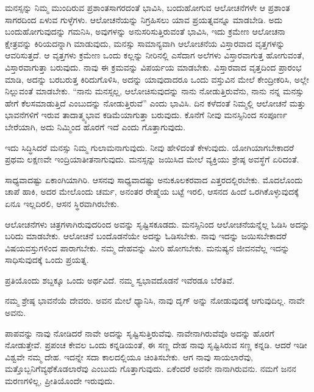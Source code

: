 \vskip 3pt

ಮನಸ್ಸನ್ನು ನಿಮ್ಮ ಮುಂದಿರುವ ಪ್ರಶಾಂತಸಾಗರದಂತೆ ಭಾವಿಸಿ, ಬಂದುಹೋಗುವ ಆಲೋಚನೆಗಳೇ ಆ ಪ್ರಶಾಂತ ಸಾಗರದಿಂದ ಏಳುವ ಗುಳ್ಳೆಗಳು. ಆಲೋಚನೆಯನ್ನು ನಿಗ್ರಹಿಸಲು ಯಾವ ಪ್ರಯತ್ನವನ್ನೂ ಮಾಡಬೇಡಿ. ಅದು ಬಂದುಹೋಗುವುದನ್ನು ಗಮನಿಸಿ, ಅವುಗಳನ್ನು ಅನುಸರಿಸುತ್ತಿರುವಂತೆ ಭಾವಿಸಿ, ಇದು ಕ್ರಮೇಣ ಆಲೋಚನಾ ಕ್ಷೇತ್ರವನ್ನು ಕಿರಿಯದನ್ನಾಗಿ ಮಾಡುವುದು, ಮನಸ್ಸು ಸಾಮಾನ್ಯವಾಗಿ ಆಲೋಚನೆಯ ವಿಸ್ತಾರವಾದ ವೃತ್ತಗಳನ್ನು ಆವರಿಸುತ್ತದೆ. ಆ ವೃತ್ತಗಳು ಕ್ರಮೇಣ ಒಂದು ಕಲ್ಲನ್ನು ನೀರಿನಲ್ಲಿ ಎಸೆದಾಗ ಅಲೆಗಳು ವಿಸ್ತಾರವಾಗುತ್ತ ಹೋಗುವಂತೆ, ವಿಸ್ತಾರವಾಗುತ್ತಾ ಬರುವುದು. ನಾವು ಈ ಕ್ರಮವನ್ನು ವಿಪರ್ಯಯ ಮಾಡಬೇಕು. ವಿಸ್ತಾರವಾದ ವೃತ್ತದಿಂದ ಪ್ರಾರಂಭ ಮಾಡಿ, ಅದನ್ನು ಬರಬರುತ್ತ ಕಿರಿದುಗೊಳಿಸಿ, ಅದನ್ನು ಯಾವುದಾದರೂ ಒಂದು ವಸ್ತುವಿನ ಮೇಲೆ ಕೇಂದ್ರೀಕರಿಸಿ, ಅಲ್ಲೇ ನಿಲ್ಲುವಂತೆ ಮಾಡಬೇಕು. “ನಾನು ಮನಸ್ಸಲ್ಲ, ಆಲೋಚಿಸುವುದನ್ನು ನಾನು ನೋಡುತ್ತಿರುವೆನು, ನಾನು ನನ್ನ ಮನಸ್ಸು ಹೇಗೆ ಕೆಲಸಮಾಡುತ್ತಿದೆ ಎಂಬುದನ್ನು ನೋಡುತ್ತಿರುವೆ'' ಎಂದು ಭಾವಿಸಿ. ದಿನ ಕಳೆದಂತೆ ನಿಮ್ಮಲ್ಲಿ ಆಲೋಚನೆ ಮತ್ತು ಭಾವನೆಗಳಿಗೆ ಇರುವ ತಾದಾತ್ಮ್ಯಭಾವ ಕಡಿಮೆಯಾಗುತ್ತಾ ಬರುವುದು. ಕೊನೆಗೆ ನೀವು ಮನಸ್ಸಿನಿಂದ ಸಂಪೂರ್ಣ ಬೇರೆಯಾಗಿ, ಅದು ನಿಮ್ಮಿಂದ ಹೊರಗೆ ಇದೆ ಎಂದು ಗೊತ್ತಾಗುವುದು.

\vskip 3pt

ಇದು ಸಿದ್ಧಿಸಿದರೆ ಮನಸ್ಸು ನಿಮ್ಮ ಗುಲಾಮನಾಗುವುದು. ನೀವು ಹೇಳಿದಂತೆ ಕೇಳುವುದು. ಯೋಗಿಯಾಗಬೇಕಾದರೆ ಪ್ರಥಮ ಲಕ್ಷಣವೇ ಇಂದ್ರಿಯಾತೀತನಾಗುವುದು. ಮನಸ್ಸನ್ನು ಜಯಿಸಿದ ಮೇಲೆ ವ್ಯಕ್ತಿಯು ಶ್ರೇಷ್ಠ ಅವಸ್ಥೆಗೆ ಏರಿದಂತೆ.

\vskip 3pt

ಸಾಧ್ಯವಾದಷ್ಟು ಏಕಾಂಗಿಯಾಗಿರಿ. ಆಸನವು ಸಾಧ್ಯವಾದಷ್ಟು ಅನುಕೂಲಕರವಾದ ಎತ್ತರದಲ್ಲಿರಬೇಕು. ಮೊದಲೊಂದು ಚಾಪೆ ಹಾಕಿ, ಅದರ ಮೇಲೊಂದು ಚರ್ಮ, ಅನಂತರ ರೇಷ್ಮೆಯ ಬಟ್ಟೆ ಇರಲಿ, ಆಸನದ ಹಿಂದೆ ಒರಗಿಕೊಳ್ಳುವುದಕ್ಕೆ ಏನೂ ಇಲ್ಲದಿರಲಿ, ಆಸನ ಸ್ಥಿರವಾಗಿರಬೇಕು.

\vskip 3pt

ಆಲೋಚನೆಗಳು ಚಿತ್ರಗಳಾಗಿರುವುದರಿಂದ ಅವನ್ನು ಸೃಷ್ಟಿಸಕೂಡದು. ಮನಸ್ಸಿನಿಂದ ಆಲೋಚನೆಯನ್ನೆಲ್ಲ ಓಡಿಸಿ ಅದನ್ನು ಬರಿದು ಮಾಡಬೇಕು. ಆಲೋಚನೆ ಬಂದೊಡನೆಯೇ ಅದನ್ನು ಓಡಿಸಬೇಕು. ನಾವು ಇದನ್ನು ಜಯಿಸಬೇಕಾದರೆ ವಿಷಯವಸ್ತುಗಳಿಂದ ಪಾರಾಗಬೇಕು. ನಮ್ಮ ದೇಹವನ್ನು ಮೀರಿ ಹೋಗಬೇಕು. ಮನುಷ್ಯನ ಜೀವನವೆಲ್ಲ ಇದನ್ನು ಸಾಧಿಸುವುದಕ್ಕೆ ಒಂದು ಪ್ರಯತ್ನ.

\vskip 2pt

ಪ್ರತಿಯೊಂದು ಶಬ್ದಕ್ಕೂ ಒಂದು ಅರ್ಥವಿದೆ. ನಮ್ಮ ಸ್ವಭಾವದೊಡನೆ ಇವೆರಡೂ ಬೆರೆತಿವೆ.

\vskip 2pt

ನಮ್ಮ ಶ್ರೇಷ್ಠ ಭಾವನೆಯೆ ದೇವರು. ಅವನ ಮೇಲೆ ಧ್ಯಾನಿಸಿ, ನಾವು ದೃಗ್ ಅನ್ನು ನೋಡುವುದಕ್ಕೆ ಆಗುವುದಿಲ್ಲ. ನಾವೇ ಅವನು.

\vskip 2pt

ಪಾಪವನ್ನು ನಾವು ನೋಡಿದರೆ ನಾವೇ ಅದನ್ನು ಸೃಷ್ಟಿಸುತ್ತಿರುವೆವು. ನಾವೇನಾಗಿರುವೆವೊ ಅದನ್ನು ಹೊರಗೆ ನೋಡುತ್ತೇವೆ. ಪ್ರಪಂಚ ಕೇವಲ ಒಂದು ಕನ್ನಡಿಯಂತೆ, ಈ ಸಣ್ಣ ದೇಹ ನಾವು ಸೃಷ್ಟಿಸಿರುವ ಸಣ್ಣ ಕನ್ನಡಿ. ಆದರೆ ಇಡೀ ವಿಶ್ವವೇ ನಮ್ಮ ದೇಹ. ಇದನ್ನೇ ಸದಾ ಕಾಲದಲ್ಲಿಯೂ ಚಿಂತಿಸಬೇಕು. ಆಗ ನಾವು ಸಾಯಲಾರೆವು, ಮತ್ತೊಬ್ಬನಿಗೆ\break ವ್ಯಥೆಕೊಡಲಾರೆವು ಎಂಬುದು ಗೊತ್ತಾಗುವುದು. ಏಕೆಂದರೆ ಅವನೇ ನಾನಾಗಿರುವನು. ನಮಗೆ ಜನನ ಮರಣಗಳಿಲ್ಲ, ಪ್ರೀತಿಯೊಂದೇ ಇರುವುದು.

